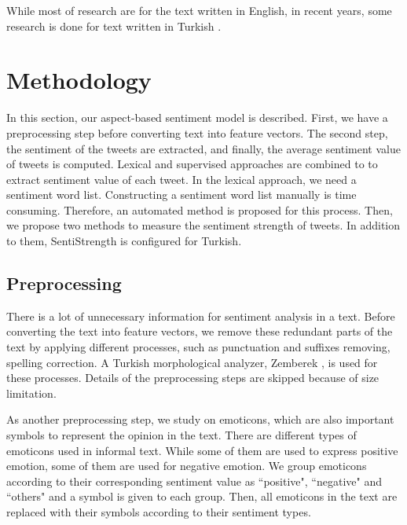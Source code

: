 \documentclass[12pt]{article}
\begin{document}
While most of research are for the text written in English, in recent years, some research is done for text written in
Turkish \cite{TALS,Oddu,TSA,parlar2016new,TSS}. 

\section{Methodology}
In this section, our aspect-based sentiment model is described. First, we have a preprocessing step before converting text into feature vectors. The second step, the sentiment of the tweets are extracted, and finally, the average sentiment value of tweets is computed.  Lexical and supervised approaches are combined to to extract sentiment value of each tweet. In the lexical approach, we need a sentiment word list. Constructing a sentiment word list manually is time consuming. Therefore, an automated method is proposed for this process. Then, we propose two methods to measure the sentiment strength of tweets. In addition to them, SentiStrength\cite{2} is configured for Turkish.

\subsection{Preprocessing}
There is a lot of unnecessary information for sentiment analysis in a text. Before converting the text into feature vectors, we remove these redundant parts of the text by applying different processes, such as punctuation and suffixes removing, spelling correction. A Turkish morphological analyzer, Zemberek \cite{Zemberek}, is used for these processes. Details of the preprocessing steps are skipped because of size limitation.

As another preprocessing step, we study on emoticons, which are also important symbols to represent the opinion in the text. There are different types of emoticons used in  informal text. While some of them are used to express positive emotion, some of them are used for negative emotion. We group emoticons according to their corresponding sentiment value as ``positive", ``negative" and ``others" and a symbol is given to each group. Then, all emoticons in the text are replaced with their symbols according to their sentiment types. 
 
\end{document}
